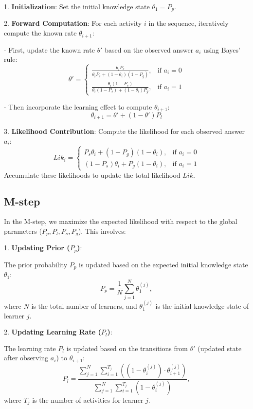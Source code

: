 \documentclass{article}
\begin{document}
1. \textbf{Initialization}:
Set the initial knowledge state \(\theta_1 = P_p\).

2. \textbf{Forward Computation}:
For each activity \(i\) in the sequence, iteratively compute the known rate \(\theta_{i+1}\):

- First, update the known rate \(\theta'\) based on the observed answer \(a_i\) using Bayes' rule:
\[
\theta' = 
\begin{cases} 
    \frac{\theta_i P_s}{\theta_i P_s + (1 - \theta_i)(1 - P_g)}, & \text{if } a_i = 0 \\
    \frac{\theta_i (1 - P_s)}{\theta_i (1 - P_s) + (1 - \theta_i)P_g}, & \text{if } a_i = 1
\end{cases}
\]

- Then incorporate the learning effect to compute \(\theta_{i+1}\):
\[
\theta_{i+1} = \theta' + (1 - \theta')P_l
\]

3. \textbf{Likelihood Contribution}:
Compute the likelihood for each observed answer \(a_i\):
\[
Lik_i = 
\begin{cases} 
    P_s \theta_i + (1 - P_g)(1 - \theta_i), & \text{if } a_i = 0 \\
    (1 - P_s)\theta_i + P_g(1 - \theta_i), & \text{if } a_i = 1
\end{cases}
\]
Accumulate these likelihoods to update the total likelihood \(Lik\).

\subsection{M-step}
In the M-step, we maximize the expected likelihood with respect to the global parameters (\(P_p, P_l, P_s, P_g\)). This involves:

1. \textbf{Updating Prior (\(P_p\))}:

    The prior probability \(P_p\) is updated based on the expected initial knowledge state \(\theta_1\):
    \[
    P_p = \frac{1}{N} \sum_{j=1}^N \theta_1^{(j)},
    \]
    where \(N\) is the total number of learners, and \(\theta_1^{(j)}\) is the initial knowledge state of learner \(j\).

2. \textbf{Updating Learning Rate (\(P_l\))}:

    The learning rate \(P_l\) is updated based on the transitions from \(\theta'\) (updated state after observing \(a_i\)) to \(\theta_{i+1}\):
    \[
    P_l = \frac{\sum_{j=1}^N \sum_{i=1}^{T_j} \left( (1 - \theta_i^{(j)}) \cdot \theta_{i+1}^{(j)} \right)}{\sum_{j=1}^N \sum_{i=1}^{T_j} (1 - \theta_i^{(j)})},
    \]
    where \(T_j\) is the number of activities for learner \(j\).
\end{document}
